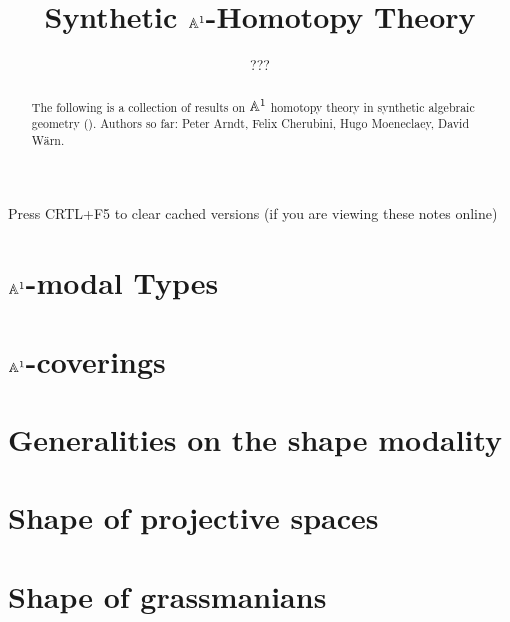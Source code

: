 \documentclass{../util/zariski}
\title{Synthetic $\mathbb{A}^1$-Homotopy Theory}
\author{???}
\begin{document}
\maketitle

\begin{center}
  \color{purple}
  \large{Press CRTL+F5 to clear cached versions}
  \large{(if you are viewing these notes online)}
\end{center}

\begin{abstract}
  The following is a collection of results on $\mathbb{A}^1$ homotopy theory in synthetic algebraic geometry (\cite{draft}).
  Authors so far: Peter Arndt, Felix Cherubini, Hugo Moeneclaey, David Wärn. 
\end{abstract}

\tableofcontents

\section{$\mathbb{A}^1$-modal Types}


%

\section{$\mathbb{A}^1$-coverings}


\section{Generalities on the shape modality}


\section{Shape of projective spaces}


\section{Shape of grassmanians}


\printindex

\printbibliography
\end{document}
